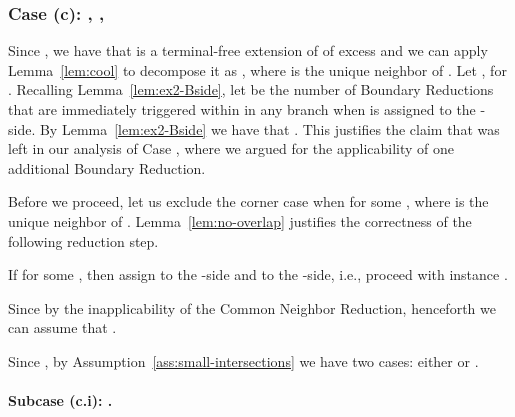 \begin{comment}
Suppose first that  is an antenna, then by the definition of the antenna we have that  or , depending whether  or  is the natural side of . Moreover, one Boundary Reduction is triggered on , and by  we know that this Boundary Reduction was not accounted for in the previous calculations. Hence, we obtain branching vector , or , or better, depending on the natural side of . Since , these branching vectors are good.

Suppose now that  is of type , and moreover that investigation of its situation also leads to the same case (b). Then we have that  and  by Lemma~\ref{lem:lb}, and at least one Boundary Reduction is applied in both of the branches on 
\end{comment}

\subsubsection{Case (c): , , }



Since , we have that  is a terminal-free extension of  of excess  and we can apply Lemma~\ref{lem:cool} to decompose it as , where  is the unique neighbor of . Let , for . Recalling Lemma~\ref{lem:ex2-Bside}, let  be the number of Boundary Reductions that are immediately triggered within  in any branch when  is assigned to the -side. By Lemma~\ref{lem:ex2-Bside} we have that . This justifies the claim that was left in our analysis of Case , where we argued for the applicability of one additional Boundary Reduction.

Before we proceed, let us exclude the corner case when  for some , where  is the unique neighbor of . Lemma~\ref{lem:no-overlap} justifies the correctness of the following reduction step.

\begin{reductionstep}
If  for some , then assign  to the -side and  to the -side, i.e., proceed with instance .
\end{reductionstep}

Since  by the inapplicability of the Common Neighbor Reduction, henceforth we can assume that . 

Since , by Assumption~\ref{ass:small-intersections} we have two cases: either  or .

\paragraph*{Subcase (c.i): .} 

